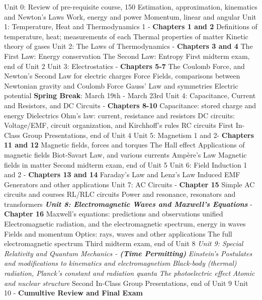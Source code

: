 \documentclass[10pt]{article}
\begin{document}
\begin{outline}[enumerate]
\1 Unit 0: Review of pre-requisite course, 150
\2 Estimation, approximation, kinematics and Newton's Laws
\2 Work, energy and power
\2 Momentum, linear and angular
\1 Unit 1: Temperature, Heat and Thermodynamics 1 - \textbf{Chapters 1 and 2}
\2 Definitions of temperature, heat; measurements of each
\2 Thermal properties of matter
\2 Kinetic theory of gases
\1 Unit 2: The Laws of Thermodynamics - \textbf{Chapters 3 and 4}
\2 The First Law: Energy conservation 
\2 The Second Law: Entropy
\1 First midterm exam, end of Unit 2
\1 Unit 3: Electrostatics - \textbf{Chapters 5-7}
\2 The Coulomb Force, and Newton's Second Law for electric charges
\2 Force Fields, comparisons between Newtonian gravity and Coulomb Force
\2 Gauss' Law and symmetries
\2 Electric potential
\1 \textbf{Spring Break}: March 19th - March 23rd
\1 Unit 4: Capacitance, Current and Resistors, and DC Circuits - \textbf{Chapters 8-10}
\2 Capacitance: stored charge and energy
\2 Dielectrics
\2 Ohm's law: current, resistance and resistors
\2 DC circuits: Voltage/EMF, circuit organization, and Kirchhoff's rules
\2 RC circuits
\1 First In-Class Group Presentations, end of Unit 4
\1 Unit 5: Magnetism 1 and 2- \textbf{Chapters 11 and 12}
\2 Magnetic fields, forces and torques
\2 The Hall effect
\2 Applications of magnetic fields
\2 Biot-Savart Law, and various currents
\2 Amp\`{e}re's Law
\2 Magnetic fields in matter
\1 Second midterm exam, end of Unit 5
\1 Unit 6: Field Induction 1 and 2 - \textbf{Chapters 13 and 14}
\2 Faraday's Law and Lenz's Law
\2 Induced EMF
\2 Generators and other applications
\1 Unit 7: AC Circuits - \textbf{Chapter 15}
\2 Simple AC circuits and courses
\2 RL/RLC circuits
\2 Power and resonance, resonators and transformers
\1 \textit{\textbf{ Unit 8: Electromagnetic Waves and Maxwell's Equations}} - \textbf{Chapter 16}
\2 Maxwell's equations: predictions and observations unified
\2 Electromagnetic radiation, and the electromagnetic spectrum, energy in waves
\2 Fields and momentum
\2 Optics: rays, waves and other applications
\2 The full electromagnetic spectrum
\1 Third midterm exam, end of Unit 8
\1 \textit{Unit 9: Special Relativity and Quantum Mechanics - \textbf{(Time Permitting)}}
\2 \textit{Einstein's Postulates and modifications to kinematics and electromagnetism}
\2 \textit{Black-body (thermal) radiation, Planck's constant and radiation quanta}
\2 \textit{The photoelectric effect}
\2 \textit{Atomic and nuclear structure}
\1 Second In-Class Group Presentations, end of Unit 9
\1 Unit 10 - \textbf{Cumultive Review and Final Exam}
\end{outline}
\end{document}
